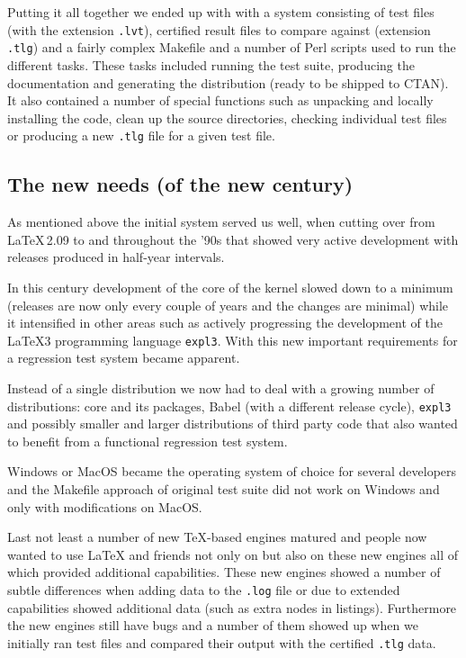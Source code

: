 \documentclass[a4paper]{ltugboat}
\begin{document}
Putting it all together we ended up with with a system consisting of
test files (with the extension \texttt{.lvt}), certified result files
to compare against (extension \texttt{.tlg}) and a fairly complex
Makefile and a number of Perl scripts used to run the different
tasks. These tasks included running the test suite, producing the
documentation and generating the distribution (ready to be shipped to
CTAN). It also contained a number of special functions such as
unpacking and locally installing the code, clean up the source
directories, checking individual test files or producing a new
\texttt{.tlg} file for a given test file.


\subsection{The new needs (of the new century)}

As mentioned above the initial system served us well, when cutting
over from \LaTeX\,2.09 to \LaTeXe{} and throughout the '90s that
showed very active \LaTeXe{} development with releases produced in
half-year intervals.

In this century development of the core of the \LaTeXe{} kernel slowed
down to a minimum (releases are now only every couple of years and the
changes are minimal) while it intensified in other areas such as
actively progressing the development of the \LaTeX3 programming
language \texttt{expl3}. With this new important requirements for a
regression test system became apparent.

Instead of a single distribution we now had to deal with a growing
number of distributions: core \LaTeXe{} and its packages, Babel (with
a different release cycle), \texttt{expl3} and possibly smaller and
larger distributions of third party code that also wanted to benefit
from a functional regression test system.

Windows or MacOS became the operating system of choice for several
developers and the Makefile approach of original test suite did not
work on Windows and only with modifications on MacOS.

Last not least a number of new \TeX-based engines matured and people
now wanted to use \LaTeX{} and friends not only on \pdfTeX{} but also
on these new engines all of which provided additional capabilities.
These new engines showed a number of subtle differences when adding
data to the \texttt{.log} file or due to extended capabilities showed
additional data (such as extra nodes in listings). Furthermore the new
engines still have bugs and a number of them showed up when we
initially ran test files and compared their output with the certified
\texttt{.tlg} data.
\end{document}
